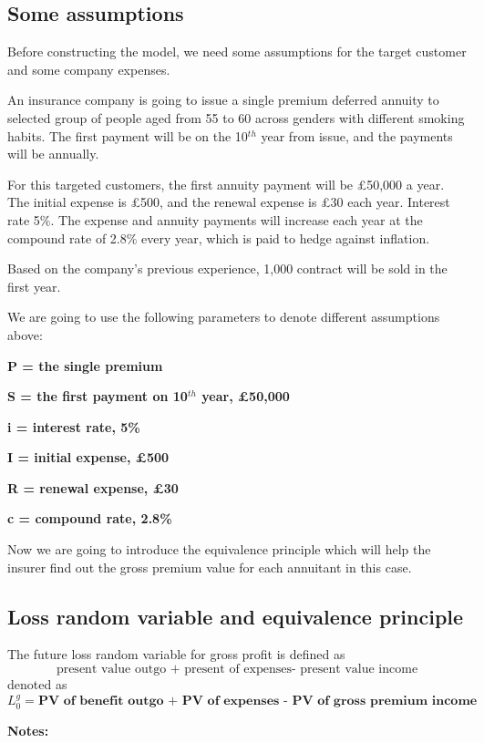 \documentclass{report}
\begin{document}
\subsection{Some assumptions}

Before constructing the model, we need some assumptions for the target customer and some company expenses.

An insurance company is going to issue a single premium deferred annuity to selected group of people aged from 55 to 60 across genders with different smoking habits. The first payment will be on the 10$^{th}$ year from issue, and the payments will be annually.

For this targeted customers, the first annuity payment will be \pounds 50,000 a year. The initial expense is \pounds500, and the renewal expense is \pounds30 each year. Interest rate 5\%. The expense and annuity payments will increase each year at the compound rate of 2.8\% every year, which is paid to hedge against inflation.

Based on the company's previous experience, 1,000 contract will be sold in the first year. 

We are going to use the following parameters to denote different assumptions above:

\textbf{P = the single premium}

\textbf{S = the first payment on 10$^{th}$ year, \pounds50,000}

\textbf{i = interest rate, 5\%}

\textbf{I = initial expense, \pounds500}

\textbf{R = renewal expense, \pounds30}

\textbf{c = compound rate, 2.8\%}


Now we are going to introduce the equivalence principle which will help the insurer find out the gross premium value for each annuitant in this case.



\subsection{Loss random variable and equivalence principle}

The future loss random variable for gross profit is defined as 
\[
\text{present value outgo + present of expenses- present value income}
\]
denoted as
\[
\textbf{$L_0^g$} = \textbf{PV of benefit outgo + PV of expenses - PV of gross premium income}
\]

\textbf{Notes:}
\end{document}
